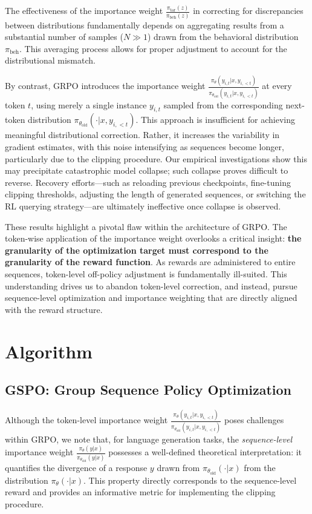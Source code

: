 The effectiveness of the importance weight $\frac{ \pi_\text{tar} (z) }{ \pi_\text{beh} (z)}$ in correcting for discrepancies between distributions fundamentally depends on aggregating results from a substantial number of samples ($N \gg 1$) drawn from the behavioral distribution $\pi_\text{beh}$. This averaging process allows for proper adjustment to account for the distributional mismatch.

By contrast, GRPO introduces the importance weight $\frac{ \pi_{\theta} (y_{i,t} | x, y_{i,<t}) }{ \pi_{\theta_\text{old}} (y_{i,t} | x,y_{i,<t})}$ at every token $t$, using merely a single instance $y_{i,t}$ sampled from the corresponding next-token distribution $\pi_{\theta_\text{old}}( \cdot | x, y_{i, <t})$. This approach is insufficient for achieving meaningful distributional correction. Rather, it increases the variability in gradient estimates, with this noise intensifying as sequences become longer, particularly due to the clipping procedure. Our empirical investigations show this may precipitate catastrophic model collapse; such collapse proves difficult to reverse. Recovery efforts—such as reloading previous checkpoints, fine-tuning clipping thresholds, adjusting the length of generated sequences, or switching the RL querying strategy—are ultimately ineffective once collapse is observed.

These results highlight a pivotal flaw within the architecture of GRPO. The token-wise application of the importance weight overlooks a critical insight: \textbf{the granularity of the optimization target must correspond to the granularity of the reward function}. As rewards are administered to entire sequences, token-level off-policy adjustment is fundamentally ill-suited. This understanding drives us to abandon token-level correction, and instead, pursue sequence-level optimization and importance weighting that are directly aligned with the reward structure.

\section{Algorithm}

\subsection{GSPO: Group Sequence Policy Optimization}

Although the token-level importance weight $\frac{ \pi_{\theta} (y_{i,t} | x, y_{i,<t}) }{ \pi_{\theta_\text{old}} (y_{i,t} | x, y_{i,<t})}$ poses challenges within GRPO, we note that, for language generation tasks, the \textit{sequence-level} importance weight $\frac{ \pi_{\theta} (y | x) }{ \pi_{\theta_\text{old}} (y | x)}$ possesses a well-defined theoretical interpretation: it quantifies the divergence of a response $y$ drawn from $\pi_{\theta_\text{old}} (\cdot | x)$ from the distribution $\pi_{\theta} (\cdot | x)$. This property directly corresponds to the sequence-level reward and provides an informative metric for implementing the clipping procedure.

